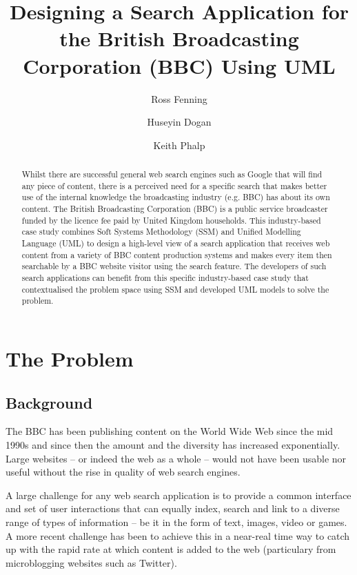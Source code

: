 \documentclass{llncs}
\title{Designing a Search Application for the British Broadcasting Corporation (BBC) Using UML}
\author{Ross Fenning\inst{1}
  \and Huseyin Dogan\inst{2}
  \and Keith Phalp\inst{2}}
\institute{BBC, UK \email{Ross.Fenning@bbc.co.uk}
  \and Bournemouth University, UK \email{\{hdogan,kphalp\}@bournemouth.ac.uk}}
\begin{document}
\maketitle

\begin{abstract}

Whilst there are successful general web search engines such as Google that
will find any piece of content, there is a perceived need for a specific
search that makes better use of the internal knowledge the broadcasting
industry (e.g. BBC) has about its own content. The British Broadcasting
Corporation (BBC) is a public service broadcaster funded by the licence
fee paid by United Kingdom households. This industry-based case study
combines Soft Systems Methodology (SSM) and Unified Modelling Language
(UML) to design a high-level view of a search application that receives
web content from a variety of BBC content production systems and makes
every item then searchable by a BBC website visitor using the search
feature. The developers of such search applications can benefit from this
specific industry-based case study that contextualised the problem space
using SSM and developed UML models to solve the problem.

\end{abstract}

\section{The Problem}

\subsection{Background}

The BBC has been publishing content on the World Wide Web since the
mid 1990s and since then the amount and the diversity has increased
exponentially. Large websites -- or indeed the web as a whole --
would not have been usable nor useful without the rise in quality of
web search engines.

A large challenge for any web search application is to provide a common
interface and set of user interactions that can equally index, search
and link to a diverse range of types of information -- be it in the form
of text, images, video or games. A more recent challenge has been to
achieve this in a near-real time way to catch up with the rapid rate at
which content is added to the web (particulary from microblogging websites
such as Twitter).
\end{document}
